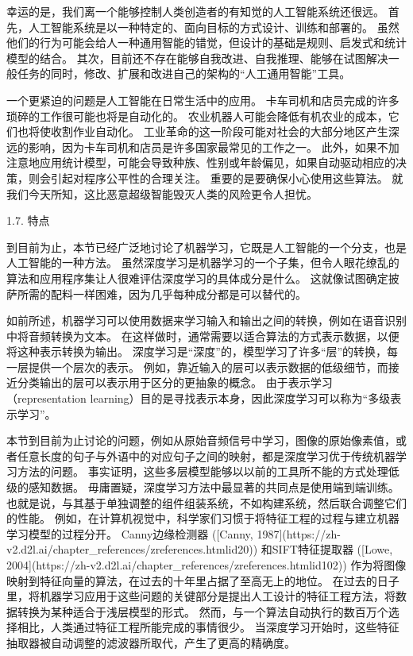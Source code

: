 幸运的是，我们离一个能够控制人类创造者的有知觉的人工智能系统还很远。 首先，人工智能系统是以一种特定的、面向目标的方式设计、训练和部署的。 虽然他们的行为可能会给人一种通用智能的错觉，但设计的基础是规则、启发式和统计模型的结合。 其次，目前还不存在能够自我改进、自我推理、能够在试图解决一般任务的同时，修改、扩展和改进自己的架构的“人工通用智能”工具。

一个更紧迫的问题是人工智能在日常生活中的应用。 卡车司机和店员完成的许多琐碎的工作很可能也将是自动化的。 农业机器人可能会降低有机农业的成本，它们也将使收割作业自动化。 工业革命的这一阶段可能对社会的大部分地区产生深远的影响，因为卡车司机和店员是许多国家最常见的工作之一。 此外，如果不加注意地应用统计模型，可能会导致种族、性别或年龄偏见，如果自动驱动相应的决策，则会引起对程序公平性的合理关注。 重要的是要确保小心使用这些算法。 就我们今天所知，这比恶意超级智能毁灭人类的风险更令人担忧。

 1.7. 特点

到目前为止，本节已经广泛地讨论了机器学习，它既是人工智能的一个分支，也是人工智能的一种方法。 虽然深度学习是机器学习的一个子集，但令人眼花缭乱的算法和应用程序集让人很难评估深度学习的具体成分是什么。 这就像试图确定披萨所需的配料一样困难，因为几乎每种成分都是可以替代的。

如前所述，机器学习可以使用数据来学习输入和输出之间的转换，例如在语音识别中将音频转换为文本。 在这样做时，通常需要以适合算法的方式表示数据，以便将这种表示转换为输出。 深度学习是“深度”的，模型学习了许多“层”的转换，每一层提供一个层次的表示。 例如，靠近输入的层可以表示数据的低级细节，而接近分类输出的层可以表示用于区分的更抽象的概念。 由于表示学习（representation learning）目的是寻找表示本身，因此深度学习可以称为“多级表示学习”。

本节到目前为止讨论的问题，例如从原始音频信号中学习，图像的原始像素值，或者任意长度的句子与外语中的对应句子之间的映射，都是深度学习优于传统机器学习方法的问题。 事实证明，这些多层模型能够以以前的工具所不能的方式处理低级的感知数据。 毋庸置疑，深度学习方法中最显著的共同点是使用端到端训练。 也就是说，与其基于单独调整的组件组装系统，不如构建系统，然后联合调整它们的性能。 例如，在计算机视觉中，科学家们习惯于将特征工程的过程与建立机器学习模型的过程分开。 Canny边缘检测器 ([Canny, 1987](https://zh-v2.d2l.ai/chapter\_references/zreferences.htmlid20)) 和SIFT特征提取器 ([Lowe, 2004](https://zh-v2.d2l.ai/chapter\_references/zreferences.htmlid102)) 作为将图像映射到特征向量的算法，在过去的十年里占据了至高无上的地位。 在过去的日子里，将机器学习应用于这些问题的关键部分是提出人工设计的特征工程方法，将数据转换为某种适合于浅层模型的形式。 然而，与一个算法自动执行的数百万个选择相比，人类通过特征工程所能完成的事情很少。 当深度学习开始时，这些特征抽取器被自动调整的滤波器所取代，产生了更高的精确度。

